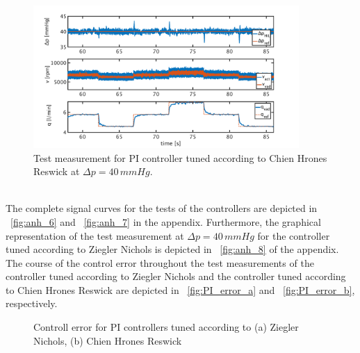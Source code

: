\begin{figure}[ht]
  \centering
  \includegraphics[width=0.9\textwidth]{images/chapt_5/pi_contr_chr_40.pdf}
  \caption[Test measurement for PI controller tuned according to Chien Hrones Reswick at $\Delta{p}=40\,mmHg$]{Test measurement for PI controller tuned according to Chien Hrones Reswick at $\Delta{p}=40\,mmHg$.}
  \label{fig:pi_contr_chr_40}
\end{figure}
\\The complete signal curves for the tests of the controllers are depicted in \figurename~\ref{fig:anh_6} and \figurename~\ref{fig:anh_7} in the appendix. Furthermore, the graphical representation of the test measurement at $\Delta{p}=40\,mmHg$ for the controller tuned according to Ziegler Nichols is depicted in \figurename~\ref{fig:anh_8} of the appendix.
\\The course of the control error throughout the test measurements of the controller tuned according to Ziegler Nichols and the controller tuned according to Chien Hrones Reswick are depicted in \figurename~\ref{fig:PI_error_a} and \figurename~\ref{fig:PI_error_b}, respectively.
\begin{figure}[ht]
  \centering
  \caption[Controll error for PI Controllers]{Controll error for PI controllers tuned according to (a) Ziegler Nichols, (b) Chien Hrones Reswick}
  \label{fig:PI_error}
\end{figure}
